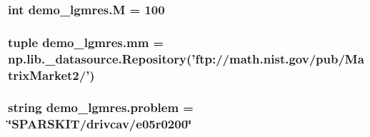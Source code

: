 \subsubsection[{M}]{\setlength{\rightskip}{0pt plus 5cm}int demo\+\_\+lgmres.\+M = 100}\label{namespacedemo__lgmres_a2ec1c24106943f3ecb84af982a6fee3f}
\hypertarget{namespacedemo__lgmres_aab755b9e30b356805a0987d4628145e6}{}
\subsubsection[{mm}]{\setlength{\rightskip}{0pt plus 5cm}tuple demo\+\_\+lgmres.\+mm = np.\+lib.\+\_\+datasource.\+Repository('ftp\+://math.\+nist.\+gov/pub/Matrix\+Market2/')}\label{namespacedemo__lgmres_aab755b9e30b356805a0987d4628145e6}
\hypertarget{namespacedemo__lgmres_a5ed74fb00faa6f503aba95750d375bea}{}
\subsubsection[{problem}]{\setlength{\rightskip}{0pt plus 5cm}string demo\+\_\+lgmres.\+problem = \char`\"{}S\+P\+A\+R\+S\+K\+I\+T/drivcav/e05r0200\char`\"{}}\label{namespacedemo__lgmres_a5ed74fb00faa6f503aba95750d375bea}
